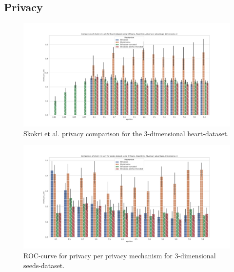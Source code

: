 \subsection{Privacy}
\begin{figure}[H]
    \includegraphics[width=\textwidth]{Results/RQ2/heart-dataset/shokri_mi_adv_heart-dataset_comparison.png}
    \caption{Skokri et al. privacy comparison for the 3-dimensional heart-dataset.}
    \label{fig:privacy_heart-dataset_comparison_3d}
\end{figure}
\begin{figure}[H]
    \includegraphics[width=\textwidth]{Results/RQ2/seeds-dataset/shokri_mi_adv_seeds-dataset_comparison.png}
    \caption{ROC-curve for privacy per privacy mechanism for 3-dimensional seeds-dataset.}
    \label{fig:privacy_seeds-dataset_comparison_3d}
\end{figure}
